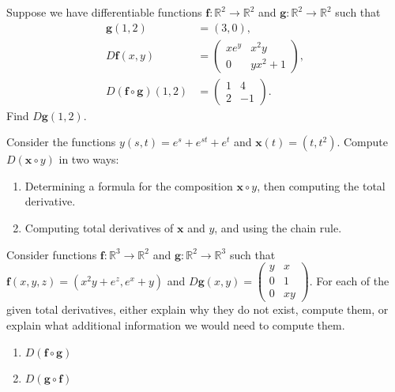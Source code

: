 \documentclass{ximera}
\begin{document}
\begin{problem}
Suppose we have differentiable functions $\mathbf{f}:\mathbb{R}^2\rightarrow\mathbb{R}^2$ and $\mathbf{g}:\mathbb{R}^2\rightarrow\mathbb{R}^2$ such that
\begin{align*}
\mathbf{g}(1,2) &= (3,0),\\
D\mathbf{f}(x,y) &= \left(\begin{array}{cc} xe^y & x^2y \\ 0 & yx^2+1\end{array}\right),\\
D(\mathbf{f}\circ\mathbf{g})(1,2) &= \left(\begin{array}{cc} 1 & 4 \\ 2 & -1\end{array}\right).
\end{align*}
Find $D\mathbf{g}(1,2)$.
\end{problem}

\begin{problem}
Consider the functions $y(s,t) = e^s + e^{st} + e^t$ and $\mathbf{x}(t) = (t, t^2)$. Compute $D(\mathbf{x}\circ y)$ in two ways:
\begin{enumerate}
\item Determining a formula for the composition $\mathbf{x}\circ y$, then computing the total derivative.
\item Computing total derivatives of $\mathbf{x}$ and $y$, and using the chain rule.
\end{enumerate}
\end{problem}

\begin{problem}
Consider functions $\mathbf{f}:\mathbb{R}^3\rightarrow\mathbb{R}^2$ and $\mathbf{g}:\mathbb{R}^2\rightarrow\mathbb{R}^3$ such that $\mathbf{f}(x,y,z) = (x^2y+e^z, e^x+y)$ and $D\mathbf{g}(x,y) = \left(\begin{array}{ccc}y&x\\0&1\\0&xy\end{array}\right)$. For each of the given total derivatives, either explain why they do not exist, compute them, or explain what additional information we would need to compute them.
\begin{enumerate}
\item $D(\mathbf{f}\circ\mathbf{g})$
\item $D(\mathbf{g}\circ\mathbf{f})$
\end{enumerate}
\end{problem}
\end{document}
